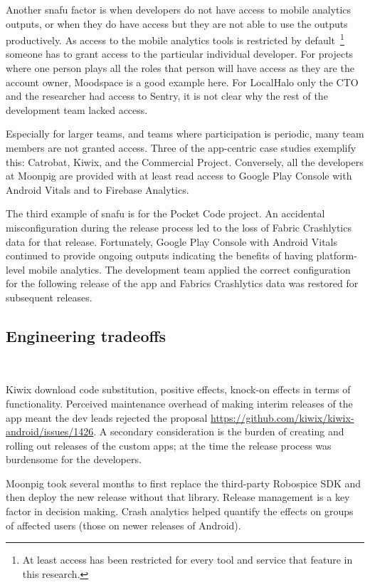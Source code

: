 Another snafu factor is when developers do not have access to mobile analytics outputs, or when they do have access but they are not able to use the outputs productively. As access to the mobile analytics tools is restricted by default~\footnote{At least access has been restricted for every tool and service that feature in this research.} someone has to grant access to the particular individual developer. For projects where one person plays all the roles that person will have access as they are the account owner, Moodspace is a good example here. For LocalHalo only the CTO and the researcher had access to Sentry, it is not clear why the rest of the development team lacked access.

Especially for larger teams, and teams where participation is periodic, many team members are not granted access. Three of the app-centric case studies exemplify this: Catrobat, Kiwix, and the Commercial Project. Conversely, all the developers at Moonpig are provided with at least read access to Google Play Console with Android Vitals and to Firebase Analytics.

The third example of snafu is for the Pocket Code project. An accidental misconfiguration during the release process led to the loss of Fabric Crashlytics data for that release. Fortunately, Google Play Console with Android Vitals continued to provide ongoing outputs indicating the benefits of having platform-level mobile analytics. The development team applied the correct configuration for the following release of the app and Fabrics Crashlytics data was restored for subsequent releases.

\subsection{Engineering tradeoffs}~\label{aiu-engineering-tradeoffs-section}

Kiwix download code substitution, positive effects, knock-on effects in terms of functionality.
Perceived maintenance overhead of making interim releases of the app meant the dev leads rejected the proposal \url{https://github.com/kiwix/kiwix-android/issues/1426}. A secondary consideration is the burden of creating and rolling out releases of the custom apps; at the time the release process was burdensome for the developers. 

Moonpig took several months to first replace the third-party Robospice SDK and then deploy the new release without that library. 
Release management is a key factor in decision making. Crash analytics helped quantify the effects on groups of affected users (those on newer releases of Android).

